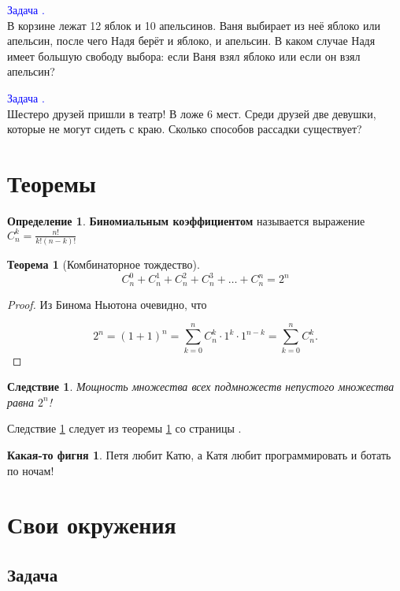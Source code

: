 \documentclass[12pt, a4paper]{article}
\theoremstyle{plain}              %
\newtheorem{theorem}{Теорема}[section]
\newtheorem{result}{Следствие}[theorem]
\theoremstyle{definition}         %
\newtheorem*{defin}{Определение}  %
\newtheorem{fignia}{Какая-то фигня}
\begin{document}
\newcommand{\ex}[1]{%
\addtocounter{i}{1}    %
\textcolor{blue}{Задача \thesection.\\}
#1\\
}


\ex{В корзине лежат 12 яблок и 10 апельсинов. Ваня выбирает из неё яблоко или апельсин, после чего Надя берёт и яблоко, и апельсин. В каком случае Надя имеет большую свободу выбора: если Ваня взял яблоко или если он взял апельсин?}

\ex{Шестеро друзей пришли в театр! В ложе 6 мест. Среди друзей две девушки, которые не могут сидеть с краю. Сколько способов рассадки существует?}



\section{Теоремы}
\begin{defin}
\textbf{ Биномиальным коэффициентом} называется выражение $C_n^k = \frac{n!}{k!(n-k)!}$
\end{defin}

\begin{theorem}[Комбинаторное тождество]\label{th:1}
 \[C_n^0 + C_n^1 + C_n^2 + C_n^3 + \ldots + C_n^n = 2^n \]
\end{theorem}
\begin{proof}
Из Бинома Ньютона очевидно, что

\[ 2^n = (1 + 1)^n = \sum_{k=0}^n C_n^k \cdot 1^k \cdot 1^{n-k} = \sum_{k=0}^n C_n^k. \]
\end{proof}

\begin{result} \label{sl:11}
Мощность множества всех подмножеств непустого множества равна $2^n$!
\end{result}

Следствие \ref{sl:11} следует из теоремы \ref{th:1} со страницы \pageref{th:1}.


\begin{fignia}
	 Петя любит Катю, а Катя любит программировать и ботать по ночам!
\end{fignia}


\section{Свои окружения}
\subsection{Задача}
\end{document}
